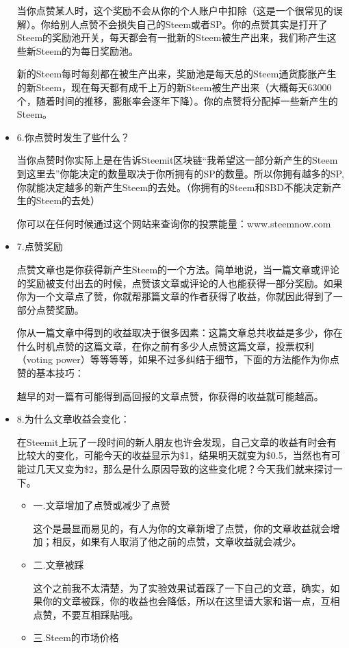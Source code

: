 \documentclass[]{ctexbook}
\begin{document}
\begin{itemize}
  当你点赞某人时，这个奖励不会从你的个人账户中扣除（这是一个很常见的误解）。你给别人点赞不会损失自己的Steem或者SP。你的点赞其实是打开了Steem的奖励池开关，每天都会有一批新的Steem被生产出来，我们称产生这些新Steem的为每日奖励池。

  新的Steem每时每刻都在被生产出来，奖励池是每天总的Steem通货膨胀产生的新Steem，现在每天都有成千上万的新Steem被生产出来（大概每天63000个，随着时间的推移，膨胀率会逐年下降）。你的点赞将分配掉一些新产生的Steem。
\item
  6.你点赞时发生了些什么？

  当你点赞时你实际上是在告诉Steemit区块链``我希望这一部分新产生的Steem到这里去''你能决定的数量取决于你所拥有的SP的数量。所以你拥有越多的SP,你就能决定越多的新产生Steem的去处。（你拥有的Steem和SBD不能决定新产生的Steem的去处）

  你可以在任何时候通过这个网站来查询你的投票能量：www.steemnow.com
\item
  7.点赞奖励

  点赞文章也是你获得新产生Steem的一个方法。简单地说，当一篇文章或评论的奖励被支付出去的时候，点赞该文章或评论的人也能获得一部分奖励。如果你为一个文章点了赞，你就帮那篇文章的作者获得了收益，你就因此得到了一部分点赞奖励。

  你从一篇文章中得到的收益取决于很多因素：这篇文章总共收益是多少，你在什么时机点赞的这篇文章，在你之前有多少人点赞这篇文章，投票权利（voting power）等等等等，如果不过多纠结于细节，下面的方法能作为你点赞的基本技巧：

  越早的对一篇有可能得到高回报的文章点赞，你获得的收益就可能越高。
\item
  8.为什么文章收益会变化：

  在Steemit上玩了一段时间的新人朋友也许会发现，自己文章的收益有时会有比较大的变化，可能今天的收益显示为\$1，结果明天就变为\$0.5，当然也有可能过几天又变为\$2，那么是什么原因导致的这些变化呢？今天我们就来探讨一下。

  \begin{itemize}
  \item
    一.文章增加了点赞或减少了点赞

    这个是最显而易见的，有人为你的文章新增了点赞，你的文章收益就会增加；相反，如果有人取消了他之前的点赞，文章收益就会减少。
  \item
    二.文章被踩

    这个之前我不太清楚，为了实验效果试着踩了一下自己的文章，确实，如果你的文章被踩，你的收益也会降低，所以在这里请大家和谐一点，互相点赞，不要互相踩贴哦。
  \item
    三.Steem的市场价格


\end{itemize}
\end{itemize}
\end{document}
